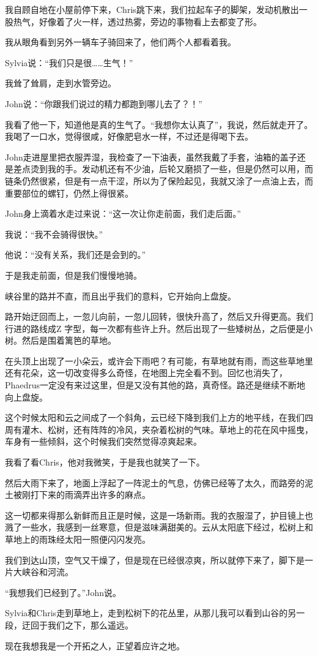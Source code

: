 \documentclass[UTF8]{article}
\begin{document}
\par 我自顾自地在小屋前停下来，Chris跳下来，我们拉起车子的脚架，发动机散出一股热气，好像着了火一样，透过热雾，旁边的事物看上去都变了形。
\par 我从眼角看到另外一辆车子骑回来了，他们两个人都看着我。
\par Sylvia说：“我们只是很……生气！”
\par 我耸了耸肩，走到水管旁边。
\par John说：“你跟我们说过的精力都跑到哪儿去了？！”
\par 我看了他一下，知道他是真的生气了。“我想你太认真了”，我说，然后就走开了。我喝了一口水，觉得很咸，好像肥皂水一样，不过还是得喝下去。
\par John走进屋里把衣服弄湿，我检查了一下油表，虽然我戴了手套，油箱的盖子还是差点烫到我的手。发动机还有不少油，后轮又磨损了一些，但是仍然可以用，而链条仍然很紧，但是有一点干涩，所以为了保险起见，我就又涂了一点油上去，而重要部位的螺钉，仍然上得很紧。
\par John身上滴着水走过来说：“这一次让你走前面，我们走后面。”
\par 我说：“我不会骑得很快。”
\par 他说：“没有关系，我们还是会到的。”
\par 于是我走前面，但是我们慢慢地骑。
\par 峡谷里的路并不直，而且出乎我们的意料，它开始向上盘旋。
\par 路开始迂回而上，一忽儿向前，一忽儿回转，很快升高了，然后又升得更高。我们行进的路线成Z 字型，每一次都有些许上升。然后出现了一些矮树丛，之后便是小树。然后是围着篱笆的草地。
\par 在头顶上出现了一小朵云，或许会下雨吧？有可能，有草地就有雨，而这些草地里还有花朵，这一切改变得多么奇怪，在地图上完全看不到。回忆也消失了，Phaedrus一定没有来过这里，但是又没有其他的路，真奇怪。路还是继续不断地向上盘旋。
\par 这个时候太阳和云之间成了一个斜角，云已经下降到我们上方的地平线，在我们四周有灌木、松树，还有阵阵的冷风，夹杂着松树的气味。草地上的花在风中摇曳，车身有一些倾斜，这个时候我们突然觉得凉爽起来。
\par 我看了看Chris，他对我微笑，于是我也就笑了一下。
\par 然后大雨下来了，地面上浮起了一阵泥土的气息，仿佛已经等了太久，而路旁的泥土被刚打下来的雨滴弄出许多的麻点。
\par 这一切都来得那么新鲜而且正是时候，这是一场新雨。我的衣服湿了，护目镜上也溅了一些水，我感到一丝寒意，但是滋味满甜美的。云从太阳底下经过，松树上和草地上的雨珠经太阳一照便闪闪发亮。
\par 我们到达山顶，空气又干燥了，但是现在已经很凉爽，所以就停下来了，脚下是一片大峡谷和河流。
\par “我想我们已经到了。”John说。
\par Sylvia和Chris走到草地上，走到松树下的花丛里，从那儿我可以看到山谷的另一段，迂回于我们之下，那么遥远。
\par 现在我想我是一个开拓之人，正望着应许之地。
\end{document}
